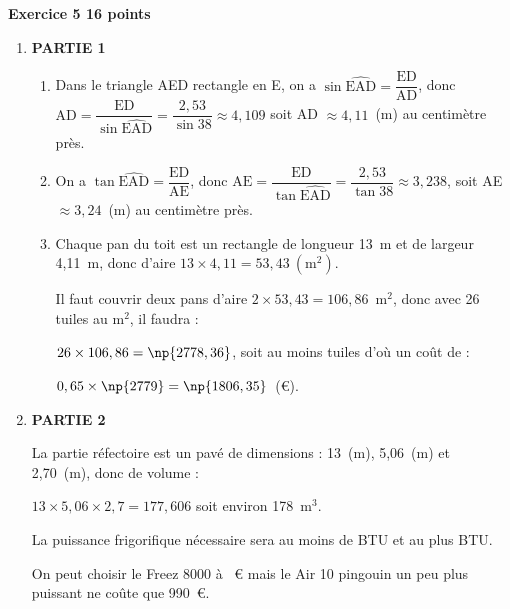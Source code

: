 \textbf{Exercice 5 \hfill 16 points}

\medskip

\begin{enumerate}
\item \textbf{PARTIE 1}
	\begin{enumerate}
		\item Dans le triangle AED rectangle en E, on a $\sin \widehat{\text{EAD}} = \dfrac{\text{ED}}{\text{AD}}$, donc $\text{AD} = \dfrac{\text{ED}}{\sin \widehat{\text{EAD}}} = \dfrac{2,53}{\sin 38} \approx 4,109$ soit AD $\approx 4,11$~(m) au centimètre près.
		\item On a $\tan \widehat{\text{EAD}} = \dfrac{\text{ED}}{\text{AE}}$, donc $\text{AE} = \dfrac{\text{ED}}{\tan \widehat{\text{EAD}}} = \dfrac{2,53}{\tan 38} \approx 3,238$, soit AE $ \approx 3,24$~(m) au centimètre près.
		\item Chaque pan du toit est un rectangle de longueur 13~m et de largeur 4,11~m, donc d'aire $13 \times 4,11 = 53,43~\left(\text{m}^2\right)$.
		
Il faut couvrir deux pans d'aire $2 \times 53,43 = 106,86$~m$^2$, donc avec 26 tuiles au m$^2$, il faudra :

$26 \times 106,86 = \np{2778,36}$, soit au moins  tuiles d'où un coût de :

$0,65 \times \np{2779} = \np{1806,35}$~(\euro).
	\end{enumerate}

\medskip

\item \textbf{PARTIE 2}

La partie réfectoire est un pavé de dimensions : 13~(m), 5,06~(m) et 2,70~(m), donc de volume :

$13 \times 5,06 \times 2,7 = 177,606$ soit environ 178~m$^3$.

La puissance frigorifique nécessaire sera au moins de  BTU et au plus  BTU.

On peut choisir le Freez 8000 à ~\euro{} mais le Air 10 pingouin un peu plus puissant ne coûte que 990~\euro.
\end{enumerate}

\bigskip

